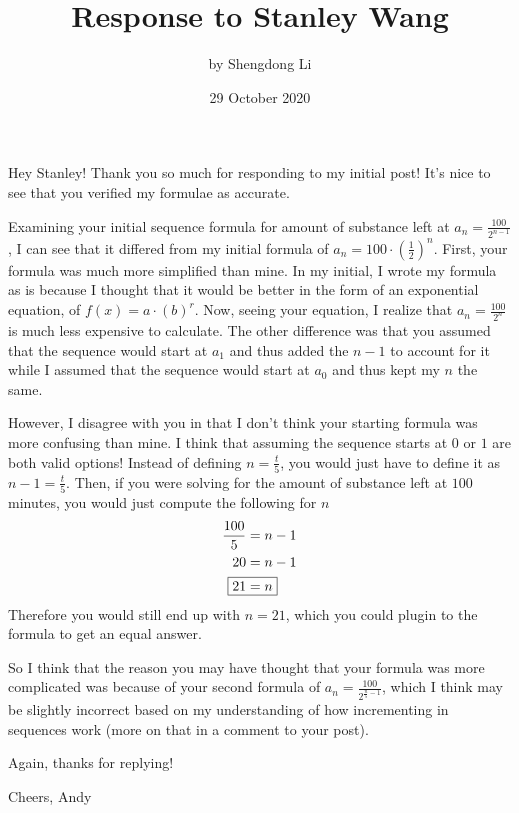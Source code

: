 \documentclass[12pt]{article}
\begin{document}
\title{Response to Stanley Wang}
\author{by Shengdong Li}
\date{29 October 2020}
\maketitle
Hey Stanley! Thank you so much for responding to my initial post!
It's nice to see that you verified my formulae as accurate.

Examining your initial sequence formula for amount of substance left at $a_{n}=\frac{100}{2^{n-1}}$, I can see that it differed from my initial formula of $a_{n}=100\cdot\left(\frac{1}{2}\right)^{n}$. First, your formula was much more simplified than mine. In my initial, I wrote my formula as is because I thought that it would be better in the form of an exponential equation, of $f\left(x\right)=a\cdot\left(b\right)^{r}$. Now, seeing your equation, I realize that $a_{n}=\frac{100}{2^{n}}$ is much less expensive to calculate. The other difference was that you assumed that the sequence would start at $a_{1}$ and thus added the $n-1$ to account for it while I assumed that the sequence would start at $a_{0}$ and thus kept my $n$ the same.

However, I disagree with you in that I don't think your starting formula was more confusing than mine. I think that assuming the sequence starts at $0$ or $1$ are both valid options! Instead of defining $n=\frac{t}{5}$, you would just have to define it as $n-1=\frac{t}{5}$. Then, if you were solving for the amount of substance left at $100$ minutes, you would just compute the following for $n$
\begin{align}
  \frac{100}{5} & =n-1 \\
  20            & =n-1 \\
  \Aboxed{21    & =n}
\end{align}
Therefore you would still end up with $n=21$, which you could plugin to the formula to get an equal answer.

So I think that the reason you may have thought that your formula was more complicated was because of your second formula of $a_{n}=\frac{100}{2^{\frac{n}{5}-1}}$, which I think may be slightly incorrect based on my understanding of how incrementing in sequences work
(more on that in a comment to your post).

Again, thanks for replying!

Cheers,
Andy
\end{document}
